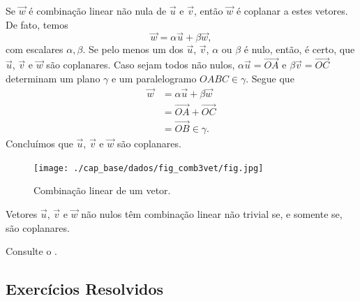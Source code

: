 Se $\vec{w}$ é combinação linear não nula de $\vec{u}$ e $\vec{v}$, então $\vec{w}$ é coplanar a estes vetores. De fato, temos
\begin{equation}
  \vec{w} = \alpha\vec{u} + \beta\vec{w},
\end{equation}
com escalares $\alpha,\beta$. Se pelo menos um dos $\vec{u}$, $\vec{v}$, $\alpha$ ou $\beta$ é nulo, então, é certo, que $\vec{u}$, $\vec{v}$ e $\vec{w}$ são coplanares. Caso sejam todos não nulos, $\alpha\vec{u}=\overrightarrow{OA}$ e $\beta\vec{v}=\overrightarrow{OC}$ determinam um plano $\gamma$ e um paralelogramo $OABC\in\gamma$. Segue que
\begin{align}
  \vec{w} &= \alpha\vec{u} + \beta\vec{w}\\
          &= \overrightarrow{OA} + \overrightarrow{OC}\\
          &= \overrightarrow{OB}\in\gamma. 
\end{align}
Concluímos que $\vec{u}$, $\vec{v}$ e $\vec{w}$ são coplanares.

\begin{figure}[h]
  \centering
  \texttt{[image: ./cap\_base/dados/fig\_comb3vet/fig.jpg]}
  \caption{Combinação linear de um vetor.}
  \label{cap_base_sec_comblin:fig:comb3vet}
\end{figure}

\begin{proposicao}\label{cap_base_sec_comblin:prop:comb3vet}
  Vetores $\vec{u}$, $\vec{v}$ e $\vec{w}$ não nulos têm combinação linear não trivial se, e somente se, são coplanares.
\end{proposicao}
\begin{demonstracao}
  Consulte o .
\end{demonstracao}

\subsection{Exercícios Resolvidos}

